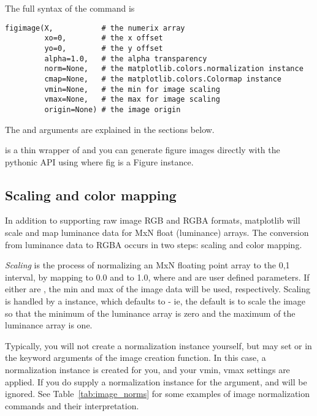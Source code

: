 \documentclass[twoside]{book}
\begin{document}
The full syntax of the  command is

\begin{lstlisting}
figimage(X,           # the numerix array
         xo=0,        # the x offset
         yo=0,        # the y offset
         alpha=1.0,   # the alpha transparency
         norm=None,   # the matplotlib.colors.normalization instance
         cmap=None,   # the matplotlib.colors.Colormap instance
         vmin=None,   # the min for image scaling 
         vmax=None,   # the max for image scaling 
         origin=None) # the image origin
\end{lstlisting}

The  and  arguments are
explained in the sections below.

 is a thin wrapper of
 and you can generate figure images
directly with the pythonic API using  where
fig is a Figure instance.

\subsection{Scaling and color mapping}
\label{sec:image_to_rgba}

In addition to supporting raw image RGB and RGBA formats, matplotlib
will scale and map luminance data for MxN float (luminance) arrays.
The conversion from luminance data to RGBA occurs in two steps:
scaling and color mapping.

\textit{Scaling} is the process of normalizing an MxN floating point
array to the 0,1 interval, by mapping  to 0.0 and
 to 1.0, where  and  are user defined
parameters.  If either are , the min and max of the image
data will be used, respectively.  Scaling is handled by a
 instance, which defaults to
 - ie, the default is to
scale the image so that the minimum of the luminance array is zero and
the maximum of the luminance array is one. 

Typically, you will not create a normalization instance yourself, but
may set  or  in the keyword arguments of the
image creation function.  In this case, a normalization instance is
created for you, and your vmin, vmax settings are applied.  If you do
supply a normalization instance for the  argument,
 and  will be ignored.  See
Table~\ref{tab:image_norms} for some examples of image normalization
commands and their interpretation.
\end{document}
